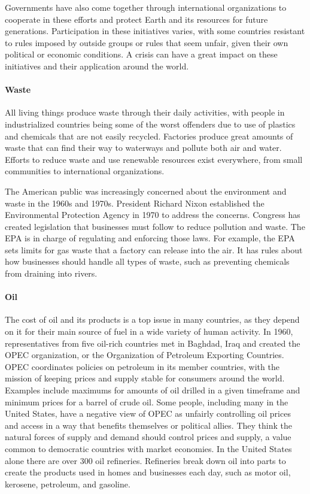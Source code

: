 Governments have also come together through international organizations to
cooperate in these efforts and protect Earth and its resources for future
generations. Participation in these initiatives varies, with some countries
resistant to rules imposed by outside groups or rules that seem unfair, given
their own political or economic conditions. A crisis can have a great impact on
these initiatives and their application around the world.

\paragraph{Waste} All living things produce waste through their daily
activities, with people in industrialized countries being some of the worst
offenders due to use of plastics and chemicals that are not easily recycled.
Factories produce great amounts of waste that can find their way to waterways
and pollute both air and water. Efforts to reduce waste and use renewable
resources exist everywhere, from small communities to international
organizations.

The American public was increasingly concerned about the environment and waste
in the 1960s and 1970s. President Richard Nixon established the Environmental
Protection Agency in 1970 to address the concerns. Congress has created
legislation that businesses must follow to reduce pollution and waste. The EPA
is in charge of regulating and enforcing those laws. For example, the EPA sets
limits for gas waste that a factory can release into the air. It has rules about
how businesses should handle all types of waste, such as preventing chemicals
from draining into rivers.

\paragraph{Oil} The cost of oil and its products is a top issue in many
countries, as they depend on it for their main source of fuel in a wide variety
of human activity. In 1960, representatives from five oil-rich countries met in
Baghdad, Iraq and created the OPEC organization, or the Organization of
Petroleum Exporting Countries. OPEC coordinates policies on petroleum in its
member countries, with the mission of keeping prices and supply stable for
consumers around the world. Examples include maximums for amounts of oil drilled
in a given timeframe and minimum prices for a barrel of crude oil. Some people,
including many in the United States, have a negative view of OPEC as unfairly
controlling oil prices and access in a way that benefits themselves or political
allies. They think the natural forces of supply and demand should control prices
and supply, a value common to democratic countries with market economies. In the
United States alone there are over 300 oil refineries. Refineries break down oil
into parts to create the products used in homes and businesses each day, such as
motor oil, kerosene, petroleum, and gasoline.

